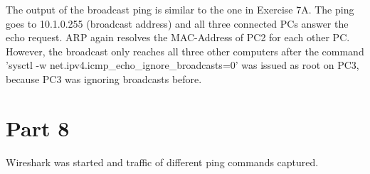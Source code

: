 \documentclass[a4paper, 11pt]{article}
\begin{document}
The output of the broadcast ping is similar to the one in Exercise 7A. The ping goes to 10.1.0.255 (broadcast address) and all three connected PCs answer the echo request.
ARP again resolves the MAC-Address of PC2 for each other PC. However, the broadcast only reaches all three other computers after the command 
'sysctl -w net.ipv4.icmp_echo_ignore_broadcasts=0' was issued as root on PC3, because PC3 was ignoring broadcasts before. 

\section{Part 8}

Wireshark was started and traffic of different ping commands captured.
\end{document}
